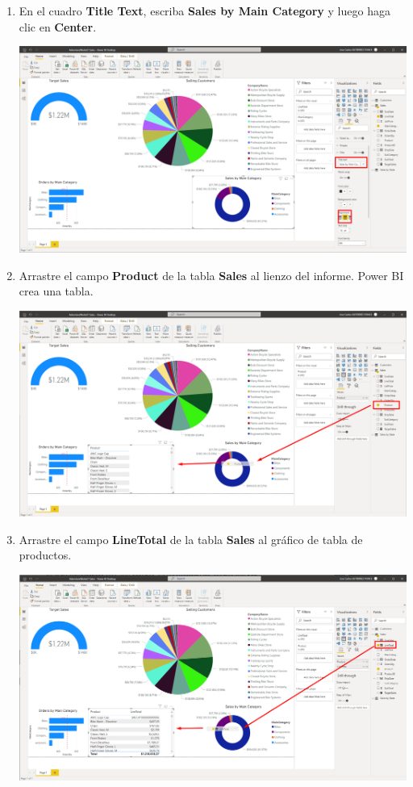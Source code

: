 \documentclass[12pt,letterpaper]{article}
\newcommand\tab[1][1cm]{\hspace*{#1}}
\begin{document}
\begin{enumerate}[\tab 1.]
\begin{center}
        \end{center}
        \item En el cuadro \textbf{Title Text}, escriba \textbf{Sales by Main Category} y luego haga clic en \textbf{Center}.
        \begin{center}
            \includegraphics[width=13cm]{./img/img102.png}
        \end{center}
        \item Arrastre el campo \textbf{Product} de la tabla \textbf{Sales} al lienzo del informe. Power BI crea una tabla.
        \begin{center}
            \includegraphics[width=13cm]{./img/img103.png}
        \end{center}
        \item Arrastre el campo \textbf{LineTotal} de la tabla \textbf{Sales} al gráfico de tabla de productos.
        \begin{center}
            \includegraphics[width=13cm]{./img/img104.png}

\end{center}
\end{enumerate}
\end{document}
